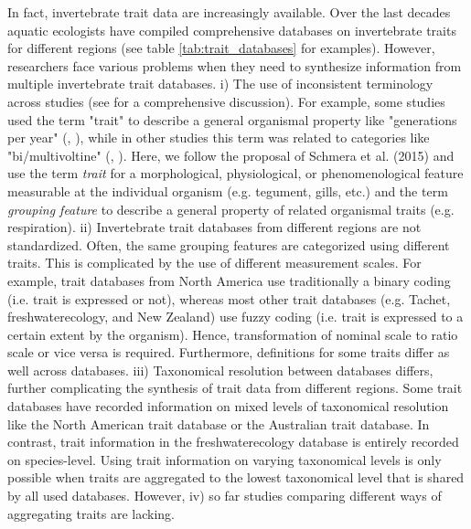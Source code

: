 \documentclass{article}
\begin{document}
In fact, invertebrate trait data are increasingly available. Over the last decades aquatic 
ecologists have compiled comprehensive databases on invertebrate traits for different regions 
(see table \ref{tab:trait_databases} for examples). 
However, researchers face various problems when they need to synthesize information from 
multiple invertebrate trait databases. 
i) The use of inconsistent terminology across studies (see \cite{schmera_proposed_2015}
for a comprehensive discussion). 
For example, some studies used the term "trait" to describe a general 
organismal property like "generations per year" (\cite{statzner_reproductive_1997}, 
\cite{ussegliopolatera_biological_2000}), while in other studies this 
term was related to categories like "bi/multivoltine" 
(\cite{haybach_use_2004}, \cite{vieira_database_nodate}). Here, we follow 
the proposal of Schmera et al. (2015) and use the term \textit{trait} for a morphological,
physiological, or phenomenological feature measurable at the individual
organism (e.g. tegument, gills, etc.) and the term \textit{grouping feature} to describe 
a general property of related organismal traits (e.g. respiration). 
ii) Invertebrate trait databases from different regions are not standardized. 
Often, the same grouping features are categorized using different traits. 
This is complicated by the use of different measurement scales. For example, trait databases 
from North America use traditionally a binary coding (i.e. trait is expressed or not), 
whereas most other trait databases (e.g. Tachet, freshwaterecology, and New Zealand) 
use fuzzy coding (i.e. trait is expressed to a certain extent by the organism). 
Hence, transformation of nominal scale to ratio scale or vice versa is required. %
Furthermore, definitions for some traits differ as well across databases. 
iii) Taxonomical resolution between databases differs, further complicating the
synthesis of trait data from different regions. Some trait databases have recorded
information on mixed levels of taxonomical resolution like the North American trait
database or the Australian trait database. In contrast, trait information in the 
freshwaterecology database is entirely recorded on species-level. %
Using trait information on varying taxonomical levels is only possible when 
traits are aggregated to the lowest taxonomical level that is shared by all used databases. 
However, iv) so far studies comparing different ways of aggregating traits are lacking.
\end{document}
